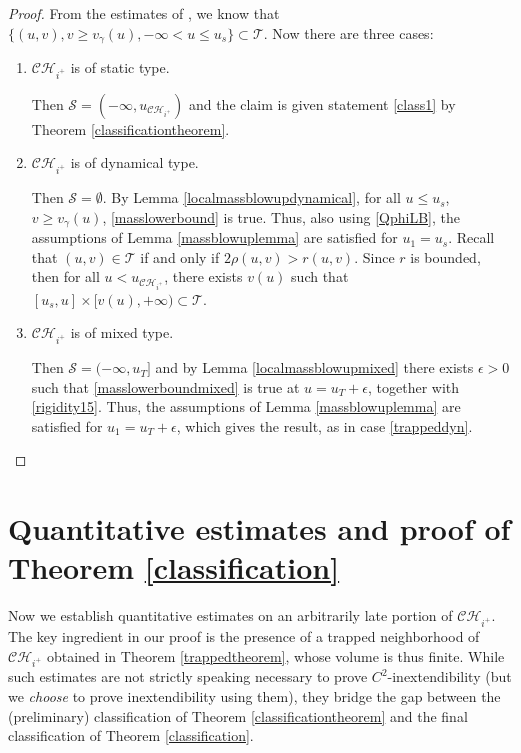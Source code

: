 \documentclass[10pt,a4paper]{article}
\theoremstyle{plain}
\theoremstyle{remark}
\newcommand{\T}{\mathcal{T}}
\theoremstyle{definition}
\theoremstyle{plain}
\theoremstyle{remark}
\theoremstyle{definition}
\newcommand{\CH}{\mathcal{CH}_{i^+}}
\numberwithin{equation}{section}
\begin{document}
\begin{proof}
	From the estimates of \cite{Moi}, we know that  $\{ (u,v), v \geq v_{\gamma}(u),-\infty <u \leq u_{s}   \} \subset \mathcal{T}$. Now there are three cases: 
	
	\begin{enumerate}[a]
		\item $\CH$ is of static type. \label{trappedrigid}
		
		Then $\mathcal{S}=(-\infty,u_{\CH})$ and the claim is given statement \ref{class1} by Theorem \ref{classificationtheorem}.  
		
		
		
		
		
		
		\item $\CH$ is of dynamical type. \label{trappeddyn}
		
		Then $\mathcal{S}=\emptyset$. By Lemma \ref{localmassblowupdynamical}, for all $u\leq u_s$, $v\geq v_{\gamma}(u)$, \eqref{masslowerbound} is true. Thus, also using \eqref{QphiLB}, the assumptions of Lemma \ref{massblowuplemma} are satisfied for $u_1=u_s$. Recall that $(u,v) \in \T$ if and only if $2\rho(u,v)>r(u,v)$.  Since $r$ is bounded, then for all $u<u_{\CH}$, there exists $v(u)$ such that $[u_s,u] \times [v(u),+\infty) \subset \mathcal{T}$.
		
		\item $\CH$ is of mixed type.
		
		Then  $\mathcal{S}=(-\infty,u_T]$ and by Lemma \eqref{localmassblowupmixed} there exists $\epsilon>0$ such that \eqref{masslowerboundmixed} is true at $u=u_T+\epsilon$, together with \eqref{rigidity15}. Thus, the assumptions of Lemma \ref{massblowuplemma} are satisfied for $u_1=u_T+\epsilon$, which gives the result, as in case \ref{trappeddyn}.
		
		
		
	\end{enumerate} 
	
\end{proof}




\section{Quantitative estimates and proof of Theorem \ref{classification}} \label{quantitative}

Now we establish quantitative estimates on an arbitrarily late portion of $\CH$. The key ingredient in our proof is the presence of a trapped neighborhood of $\CH$ obtained in Theorem \ref{trappedtheorem}, whose volume is thus finite. While such estimates are not strictly speaking necessary to prove $C^2$-inextendibility (but we \textit{choose} to prove inextendibility using them), they bridge the gap between the (preliminary) classification of Theorem \ref{classificationtheorem} and the final classification of Theorem \ref{classification}.
\end{document}

